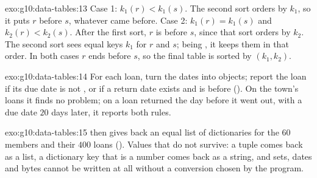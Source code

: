 \begin{solution}{exo:g10:data-tables:13}
Case 1: $k_1(r) < k_1(s)$. The second sort orders by $k_1$, so it puts $r$ before $s$, whatever came before. Case 2:
$k_1(r) = k_1(s)$ and $k_2(r) < k_2(s)$. After the first sort, $r$ is before $s$, since that sort orders by $k_2$. The
second sort sees equal keys $k_1$ for $r$ and $s$; being , it keeps them in that order. In both cases $r$ ends
before $s$, so the final table is sorted by $(k_1, k_2)$.
\end{solution}

\begin{solution}{exo:g10:data-tables:14}
For each loan, turn the dates into  objects; report the loan if its due date is not
, or if a return date exists and is before  (). On the town's loans it finds no
problem; on a loan returned the day before it went out, with a due date $20$ days later, it reports both rules.
\end{solution}

\begin{solution}{exo:g10:data-tables:15}
 then  gives back an equal list of dictionaries for the $60$ members and their
$400$ loans (). Values that do not survive: a tuple comes back as a list, a
dictionary key that is a number comes back as a string, and sets, dates and bytes cannot be written at all without a
conversion chosen by the program.
\end{solution}

